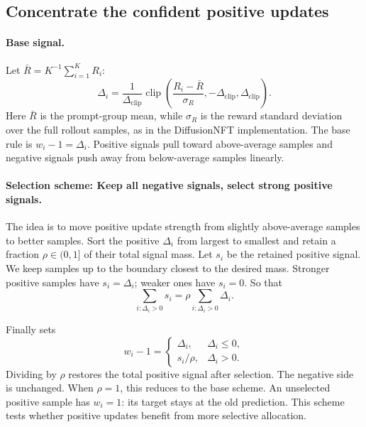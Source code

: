 \documentclass{article} %
\begin{document}
\subsection{Concentrate the confident positive updates}

\paragraph{Base signal.}
Let $\bar R=K^{-1}\sum_{i=1}^{K}R_i$:
\begin{equation}
\Delta_i=\frac{1}{\Delta_{\mathrm{clip}}}
\operatorname{clip}\!\left(
\frac{R_i-\bar R}{\sigma_R},
-\Delta_{\mathrm{clip}},\Delta_{\mathrm{clip}}\right).
\label{eq:selection-base-signal}
\end{equation}
Here $\bar R$ is the prompt-group mean, while $\sigma_R$ is the reward
standard deviation over the full rollout samples, as in the DiffusionNFT
implementation. The base rule is $w_i-1=\Delta_i$. Positive signals pull
toward above-average samples and negative signals push away from
below-average samples linearly.

\paragraph{Selection scheme: Keep all negative signals, select strong positive signals.}
The idea is to move positive update strength from slightly above-average
samples to better samples. Sort the positive $\Delta_i$ from largest to
smallest and retain a fraction $\rho\in(0,1]$ of their total signal mass.
Let $s_i$ be the retained positive signal. We keep
samples up to the boundary closest to the desired mass. Stronger positive samples have $s_i=\Delta_i$; weaker ones have $s_i=0$. So that
\begin{equation}
\sum_{i:\Delta_i>0}s_i
=\rho\sum_{i:\Delta_i>0}\Delta_i.
\label{eq:selection-retained-mass}
\end{equation}

Finally sets
\begin{equation}
w_i-1=
\begin{cases}
\Delta_i, & \Delta_i\le0,\\
s_i/\rho, & \Delta_i>0.
\end{cases}
\label{eq:scheme-c-update}
\end{equation}
Dividing by $\rho$ restores the total positive signal after
selection. The negative side is unchanged. When $\rho=1$, this reduces to
the base scheme. An unselected positive sample has $w_i=1$: its target
stays at the old prediction. This scheme tests whether
positive updates benefit from more selective allocation.
\end{document}

